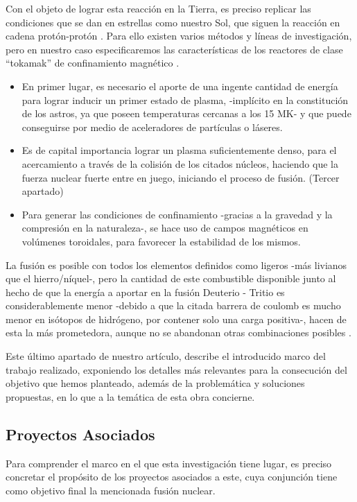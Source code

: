Con el objeto de lograr esta reacción en la Tierra, es preciso replicar las condiciones que se dan en estrellas como nuestro Sol, que siguen la reacción en cadena protón-protón \cite{42}. Para ello existen varios métodos y líneas de investigación, pero en nuestro caso especificaremos las características de los reactores de clase “tokamak” de confinamiento magnético \cite{43,44}.

\begin{itemize}
    \item En primer lugar, es necesario el aporte de una ingente cantidad de energía para lograr inducir un primer estado de plasma, -implícito en la constitución de los astros, ya que poseen temperaturas cercanas a los 15 MK- y que puede conseguirse por medio de aceleradores de partículas o láseres.
    
    \item Es de capital importancia lograr un plasma suficientemente denso, para el acercamiento a través de la colisión de los citados núcleos, haciendo que la fuerza nuclear fuerte entre en juego, iniciando el proceso de fusión. (Tercer apartado)
    
    \item Para generar las condiciones de confinamiento -gracias a la gravedad y la compresión en la naturaleza-, se hace uso de campos magnéticos en volúmenes toroidales, para favorecer la estabilidad de los mismos.
\end{itemize}

La fusión es posible con todos los elementos definidos como ligeros -más livianos que el hierro/níquel-, pero la cantidad de este combustible disponible junto al hecho de que la energía a aportar en la fusión Deuterio - Tritio es considerablemente menor -debido a que la citada barrera de coulomb es mucho menor en isótopos de hidrógeno, por contener solo una carga positiva-, hacen de esta la más prometedora, aunque no se abandonan otras combinaciones posibles \cite{45}. 

Este último apartado de nuestro artículo, describe el introducido marco del trabajo realizado, exponiendo los detalles más relevantes para la consecución del objetivo que hemos planteado, además de la problemática y soluciones propuestas, en lo que a la temática de esta obra concierne.


\subsection{Proyectos Asociados}
Para comprender el marco en el que esta investigación tiene lugar, es preciso concretar el propósito de los proyectos asociados a este, cuya conjunción tiene como objetivo final la mencionada fusión nuclear.

